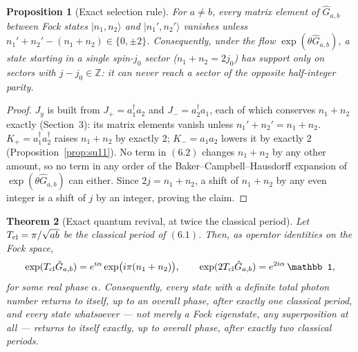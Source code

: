 \documentclass[11pt]{amsart}
\newtheorem{theorem}{Theorem}[section]
\newtheorem{proposition}[theorem]{Proposition}
\theoremstyle{remark}
\begin{document}
\begin{proposition}[Exact selection rule]\label{prop:selection}
For $a\ne b$, every matrix element of $\hat G_{a,b}$ between Fock states $|n_1,n_2\rangle$ and $|n_1',n_2'\rangle$ vanishes unless $n_1'+n_2'-(n_1+n_2)\in\{0,\pm2\}$. Consequently, under the flow $\exp(\theta\hat G_{a,b})$, a state starting in a single spin-$j_0$ sector ($n_1+n_2=2j_0$) has support only on sectors with $j-j_0\in\mathbb Z$: it can never reach a sector of the opposite half-integer parity.
\end{proposition}

\begin{proof}
$J_y$ is built from $J_+=a_1^\dagger a_2$ and $J_-=a_2^\dagger a_1$, each of which conserves $n_1+n_2$ exactly (Section~3): its matrix elements vanish unless $n_1'+n_2'=n_1+n_2$. $K_+=a_1^\dagger a_2^\dagger$ raises $n_1+n_2$ by exactly $2$; $K_-=a_1a_2$ lowers it by exactly $2$ (Proposition~\ref{prop:su11}). No term in $(6.2)$ changes $n_1+n_2$ by any other amount, so no term in any order of the Baker--Campbell--Hausdorff expansion of $\exp(\theta\hat G_{a,b})$ can either. Since $2j=n_1+n_2$, a shift of $n_1+n_2$ by any even integer is a shift of $j$ by an integer, proving the claim.
\end{proof}

\begin{theorem}[Exact quantum revival, at twice the classical period]\label{thm:revival}
Let $T_{\rm cl}=\pi/\sqrt{ab}$ be the classical period of $(6.1)$. Then, as operator identities on the Fock space,
\[
\exp(T_{\rm cl}\hat G_{a,b})=e^{i\alpha}\exp\!\big(i\pi(n_1+n_2)\big),\qquad
\exp(2T_{\rm cl}\hat G_{a,b})=e^{2i\alpha}\,\mathbb 1,
\]
for some real phase $\alpha$. Consequently, every state with a definite total photon number returns to itself, up to an overall phase, after exactly one classical period, and \emph{every} state whatsoever --- not merely a Fock eigenstate, any superposition at all --- returns to itself exactly, up to overall phase, after exactly two classical periods.
\end{theorem}
\end{document}
